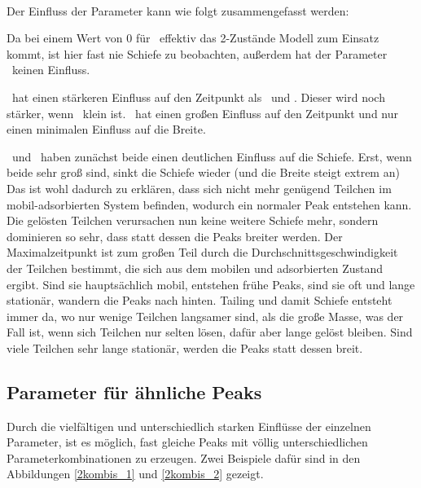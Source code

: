 
\paragraph*{}
Der Einfluss der Parameter kann wie folgt zusammengefasst werden:

Da bei einem Wert von $0$ für \pml\ effektiv das 2-Zustände Modell zum Einsatz kommt, ist hier fast nie Schiefe zu beobachten, außerdem hat der Parameter \pll\ keinen Einfluss. 

\paa\ hat einen stärkeren Einfluss auf den Zeitpunkt als \pll\ und \pml. Dieser wird noch stärker, wenn \pmm\ klein ist.
\pmm\ hat einen großen Einfluss auf den Zeitpunkt und nur einen minimalen Einfluss auf die Breite.

\pml\ und \pll\ haben zunächst beide einen deutlichen Einfluss auf die Schiefe. Erst, wenn beide sehr groß sind, sinkt die Schiefe wieder (und die Breite steigt extrem an) Das ist wohl dadurch zu erklären, dass sich nicht mehr genügend Teilchen im mobil-adsorbierten System befinden, wodurch ein normaler Peak entstehen kann. Die gelösten Teilchen verursachen nun keine weitere Schiefe mehr, sondern dominieren so sehr, dass statt dessen die Peaks breiter werden.
Der Maximalzeitpunkt ist zum großen Teil durch die Durchschnittsgeschwindigkeit der Teilchen bestimmt, die sich aus dem mobilen und adsorbierten Zustand ergibt. Sind sie hauptsächlich mobil, entstehen frühe Peaks, sind sie oft und lange stationär, wandern die Peaks nach hinten. Tailing und damit Schiefe entsteht immer da, wo nur wenige Teilchen langsamer sind, als die große Masse, was der Fall ist, wenn sich Teilchen nur selten lösen, dafür aber lange gelöst bleiben. Sind viele Teilchen sehr lange stationär, werden die Peaks statt dessen breit. 


\subsection{Parameter für ähnliche Peaks}
\label{chapter:eva_gleichePeaks}

Durch die vielfältigen und unterschiedlich starken Einflüsse der einzelnen Parameter, ist es möglich, fast gleiche Peaks mit völlig unterschiedlichen Parameterkombinationen zu erzeugen. Zwei Beispiele dafür sind in den Abbildungen \ref{2kombis_1} und \ref{2kombis_2} gezeigt.

